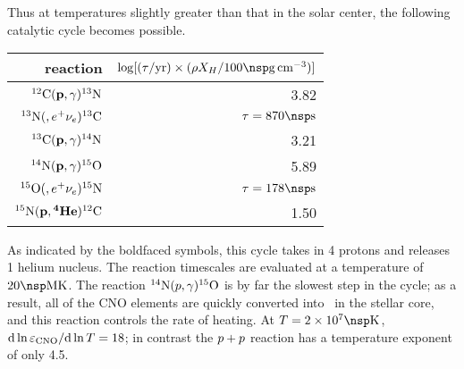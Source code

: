 Thus at temperatures slightly greater than that in the solar center, the following catalytic cycle becomes possible.
\begin{center}
\begin{tabular}{rr}
reaction & $\log[(\tau/\yr) \times (\rho X_{H}/100\nsp\grampercc)]$\\
\hline
$\carbon(\mathbf{\pt},\gamma)\nitrogen[13]$ & 3.82\\
$\nitrogen[13](,e^{+}\nu_{e})\carbon[13]$ & $\tau=870\nsp\second$\\
$\carbon[13](\mathbf{\pt},\gamma)\nitrogen[14]$ & 3.21\\
$\nitrogen[14](\mathbf{\pt},\gamma)\oxygen[15]$ & 5.89 \\
$\oxygen[15](,e^{+}\nu_{e})\nitrogen[15]$ & $\tau = 178\nsp\second$\\
$\nitrogen[15](\mathbf{\pt},\mathbf{^{4}He})\carbon$ & 1.50 \\
\hline
\end{tabular}
\end{center}
As indicated by the boldfaced symbols, this cycle takes in 4 protons and releases 1 helium nucleus.
The reaction timescales are evaluated at a temperature of $20\nsp\Mega\K$.
The reaction $\nitrogen(\pt,\gamma)\oxygen[15]$ is by far the slowest step in the cycle; as a result, all of the CNO elements are quickly converted into \nitrogen\ in the stellar core, and this reaction controls the rate of heating.  At $T = 2\ee{7}\nsp\K$, $\dif \ln \varepsilon_{\mathrm{CNO}}/\dif\ln T = 18$; in contrast the $\pt+\pt$ reaction has a temperature exponent of only 4.5.
